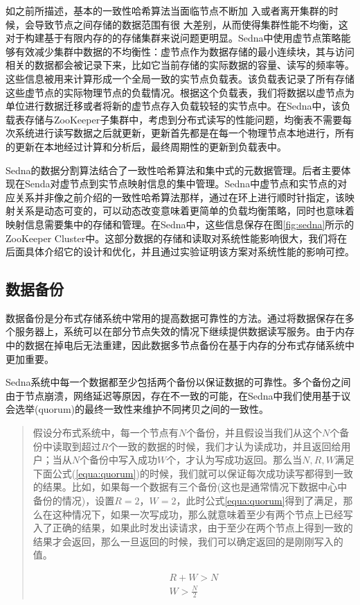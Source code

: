 如之前所描述，基本的一致性哈希算法当面临节点不断加
入或者离开集群的时候，会导致节点之间存储的数据范围有很
大差别，从而使得集群性能不均衡，这对于构建基于有限内存的的存储集群来说问题更明显。Sedna中使用虚节点策略能够有效减少集群中数据的不均衡性：虚节点作为数据存储的最小连续块，其与访问相关的数据都会被记录下来，比如它当前存储的实际数据的容量、读写的频率等。这些信息被用来计算形成一个全局一致的实节点负载表。该负载表记录了所有存储这些虚节点的实际物理节点的负载情况。根据这个负载表，我们将数据以虚节点为单位进行数据迁移或者将新的虚节点存入负载较轻的实节点中。在Sedna中，该负载表存储与ZooKeeper子集群中，考虑到分布式读写的性能问题，均衡表不需要每次系统进行读写数据之后就更新，更新首先都是在每一个物理节点本地进行，所有的更新在本地经过计算和分析后，最终周期性的更新到负载表中。

Sedna的数据分割算法结合了一致性哈希算法和集中式的元数据管理。后者主要体现在Senda对虚节点到实节点映射信息的集中管理。Sedna中虚节点和实节点的对应关系并非像之前介绍的一致性哈希算法那样，通过在环上进行顺时针指定，该映射关系是动态可变的，可以动态改变意味着更简单的负载均衡策略，同时也意味着映射信息需要集中的存储和管理。在Sedna中，这些信息保存在图\ref{fig:sedna}所示的ZooKeeper Cluster中。这部分数据的存储和读取对系统性能影响很大，我们将在后面具体介绍它的设计和优化，并且通过实验证明该方案对系统性能的影响可控。

\subsection{数据备份}
数据备份是分布式存储系统中常用的提高数据可靠性的方法。通过将数据保存在多个服务器上，系统可以在部分节点失效的情况下继续提供数据读写服务。由于内存中的数据在掉电后无法重建，因此数据多节点备份在基于内存的分布式存储系统中更加重要。

Sedna系统中每一个数据都至少包括两个备份以保证数据的可靠性。多个备份之间由于节点崩溃，网络延迟等原因，存在不一致的可能，在Sedna中我们使用基于议会选举(quorum)的最终一致性来维护不同拷贝之间的一致性。

\begin{quotation}
假设分布式系统中，每一个节点有$N$个备份，并且假设当我们从这个$N$个备份中读取到超过$R$个一致的数据的时候，我们才认为读成功，并且返回给用户；当从$N$个备份中写入成功$W$个，才认为写成功返回。那么当$N,R,W$满足下面公式(\ref{equa:quorum})的时候，我们就可以保证每次成功读写都得到一致的结果。比如，如果每一个数据有三个备份(这也是通常情况下数据中心中备份的情况)，设置$R=2$，$W=2$，此时公式\ref{equa:quorum}得到了满足，那么在这种情况下，如果一次写成功，那么就意味着至少有两个节点上已经写入了正确的结果，如果此时发出读请求，由于至少在两个节点上得到一致的结果才会返回，那么一旦返回的时候，我们可以确定返回的是刚刚写入的值。

\begin{equation}
  \label{equa:quorum}
  \begin{split}
  R + W > N  \\
  W > \frac{N}{2}
  \end{split}
\end{equation}

\end{quotation}

